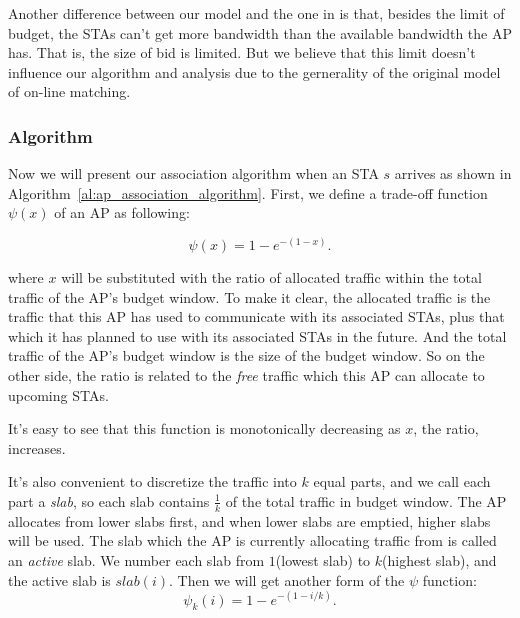 \documentclass[conference]{IEEEtran}
\begin{document}
  Another difference between our model and the one in \cite{Mehta:2007} is that, besides the limit of budget, the STAs can't get more bandwidth than the available bandwidth the AP has. That is, the size of bid is limited. But we believe that this limit doesn't influence our algorithm and analysis due to the gernerality of the original model of on-line matching.

  \subsubsection{Algorithm}
  Now we will present our association algorithm when an STA $s$ arrives as shown in Algorithm~\ref{al:ap_association_algorithm}.  First, we define a trade-off function $\psi(x)$ of an AP as following:

  \begin{displaymath}
    \psi(x) = 1-e^{-(1-x)}.
  \end{displaymath}

  where $x$ will be substituted with the ratio of allocated traffic within the total traffic of the AP's budget window. To make it clear, the allocated traffic is the traffic that this AP has used to communicate with its associated STAs, plus that which it has planned to use with its associated STAs in the future. And the total traffic of the AP's budget window is the size of the budget window. So on the other side, the ratio is related to the \emph{free} traffic which this AP can allocate to upcoming STAs.

  It's easy to see that this function is monotonically decreasing as $x$, the ratio, increases.

  It's also convenient to discretize the traffic into $k$ equal parts, and we call each part a \emph{slab}, so each slab contains $\frac{1}{k}$ of the total traffic in budget window. The AP allocates from lower slabs first, and when lower slabs are emptied, higher slabs will be used. The slab which the AP is currently allocating traffic from is called an \emph{active} slab. We number each slab from $1$(lowest slab) to $k$(highest slab), and the active slab is $slab(i)$. Then we will get another form of the $\psi$ function:
  \begin{displaymath}
    \psi_k(i) = 1-e^{-(1-i/k)}.
  \end{displaymath}
\end{document}
